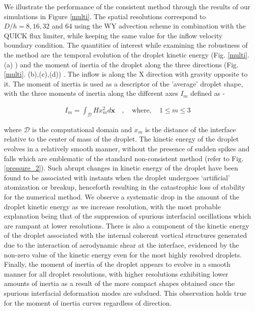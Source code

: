 We illustrate the performance of the consistent method through the 
results of our simulations in Figure \ref{multi}. 
The spatial resolutions correspond to $D/h = 8, 16, 32 $ and $64$ 
using the WY advection scheme in combination with the QUICK flux limiter, 
while keeping the same value for the inflow velocity boundary condition. 
The quantities of interest while examining the robustness of the 
method are the temporal evolution of the droplet kinetic energy 
(Fig. \ref{multi}. (a) ) and the moment of inertia of the droplet 
along the three directions (Fig. \ref{multi}. (b),(c),(d)) . 
The inflow is along the X direction with gravity opposite to it. 
The moment of inertia is used as a descriptor of the 'average' droplet shape, 
with the three moments of inertia along the different axes $I_m$ defined as - 


\begin{align}
	I_m = \int_{\mathcal{D}} H x_m^2 d \boldsymbol{x} \quad , \quad \text{where}, \quad 1 \le m \le 3
\end{align}

where $\mathcal{D}$ is the computational domain and $x_m$ is the 
distance of the interface relative to the center of mass of the droplet.   
The kinetic energy of the droplet evolves in a relatively smooth manner, 
without the presence of sudden spikes and falls which are emblematic of 
the standard non-consistent method (refer to Fig. \ref{pressure_2}). 
Such abrupt changes in kinetic energy of the droplet have been 
found to be associated with instants when the droplet undergoes 
`artificial' atomization or breakup, henceforth resulting in 
the catastrophic loss of stability for the numerical method. 
We observe a systematic drop in the amount of the droplet 
kinetic energy as we increase resolution, with the most probable explanation 
being that of the suppression of spurious interfacial 
oscillations which are rampant at lower resolutions. 
There is also a component of the kinetic energy of the droplet 
associated with the internal coherent vortical structures generated due to 
the interaction of aerodynamic shear at the interface, 
evidenced by the non-zero value of the kinetic 
energy even for the most highly resolved droplets. 
Finally, the moment of inertia of the droplet appears to evolve 
in a smooth manner for all droplet resolutions, with higher 
resolutions exhibiting lower amounts of inertia as a result of 
the more compact shapes obtained once the 
spurious interfacial deformation modes are subdued. 
This observation holds true for the moment of inertia curves regardless of direction.           


